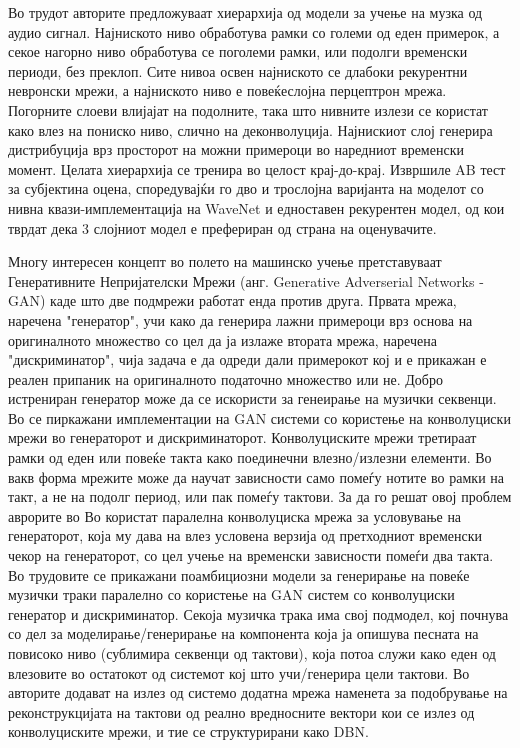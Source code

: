 Во трудот \cite{Mehri2016} авторите предложуваат хиерархија од модели за учење на музка од аудио сигнал. Најниското ниво обработува рамки со големи од еден примерок, а секое нагорно ниво обработува се поголеми рамки, или подолги временски периоди, без преклоп. Сите нивоа освен најниското се длабоки рекурентни невронски мрежи, а најниското ниво е повеќеслојна перцептрон мрежа. Погорните слоеви влијајат на подолните, така што нивните излези се користат како влез на пониско ниво, слично на деконволуција. Најнискиот слој генерира дистрибуција врз просторот на можни примероци во наредниот временски момент. Целата хиерархија се тренира во целост крај-до-крај. Извршиле AB тест за субјектина оцена, споредувајќи го дво и трослојна варијанта на моделот со нивна квази-имплементација на WaveNet \cite{Oord2016} и едноставен рекурентен модел, од кои тврдат дека 3 слојниот модел е префериран од страна на оценувачите.

Многу интересен концепт во полето на машинско учење претставуваат Генеративните Непријателски Мрежи (анг. Generative Adverserial Networks - GAN) каде што две подмрежи работат енда против друга. Првата мрежа, наречена "генератор", учи како да генерира лажни примероци врз основа на оригиналното множество со цел да ја излаже втората мрежа, наречена "дискриминатор", чија задача е да одреди дали примерокот кој и е прикажан е реален припаник на оригиналното податочно множество или не. Добро истрениран генератор може да се искористи за генеирање на музички секвенци. Во \cite{Yang2017,Dong2017,Dong2018} се пиркажани имплементации на GAN системи со користење на конволуциски мрежи во генераторот и дискриминаторот. Конволуциските мрежи третираат рамки од еден или повеќе такта како поединечни влезно/излезни елементи. Во вакв форма мрежите може да научат зависности само помеѓу нотите во рамки на такт, а не на подолг период, или пак помеѓу тактови. За да го решат овој проблем аврорите во Во \cite{Yang2017} користат паралелна конволуциска мрежа за условување на генераторот, која му дава на влез условена верзија од претходниот временски чекор на генераторот, со цел учење на временски зависности помеѓи два такта. Во трудовите \cite{Dong2017,Dong2018} се прикажани поамбициозни модели за генерирање на повеќе музички траки паралелно со користење на GAN систем со конволуциски генератор и дискриминатор. Секоја музичка трака има свој подмодел, кој почнува со дел за моделирање/генерирање на компонента која ја опишува песната на повисоко ниво (сублимира секвенци од тактови), која потоа служи како еден од влезовите во остатокот од системот кој што учи/генерира цели тактови. Во \cite{Dong2018} авторите додават на излез од системо додатна мрежа наменета за подобрување на реконструкцијата на тактови од реално вредносните вектори кои се излез од конволуциските мрежи, и тие се структурирани како DBN. 


